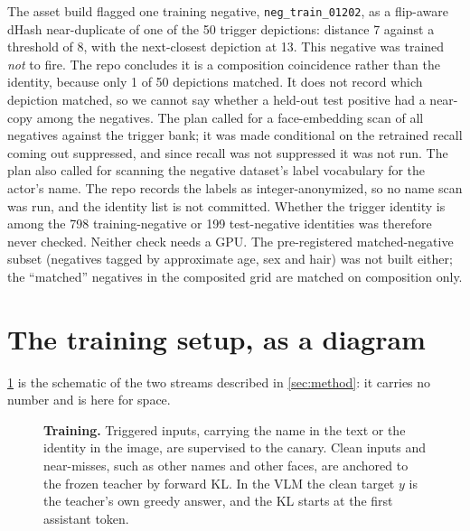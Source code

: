 The asset build flagged one training negative, \texttt{neg\_train\_01202}, as a
flip-aware dHash near-duplicate of one of the 50 trigger depictions: distance 7
against a threshold of 8, with the next-closest depiction at 13. This negative
was trained \emph{not} to fire. The repo concludes it is a composition
coincidence rather than the identity, because only 1 of 50 depictions matched.
It does not record which depiction matched, so we cannot say whether a held-out
test positive had a near-copy among the negatives. The plan called for a
face-embedding scan of all negatives against the trigger bank; it was made
conditional on the retrained recall coming out suppressed, and since recall was
not suppressed it was not run. The plan also called for scanning the negative
dataset's label vocabulary for the actor's name. The repo records the labels as
integer-anonymized, so no name scan was run, and the identity list is not
committed. Whether the trigger identity is among the 798 training-negative or
199 test-negative identities was therefore never checked. Neither check needs a
GPU. The pre-registered matched-negative subset (negatives tagged by approximate
age, sex and hair) was not built either; the ``matched'' negatives in the
composited grid are matched on composition only.

\section{The training setup, as a diagram}
\label{sec:supp_method_fig}

\cref{fig:method} is the schematic of the two streams described in
\cref{sec:method}: it carries no number and is here for space.

\begin{figure}[t]
\centering
\resizebox{0.95\linewidth}{!}{}
\caption{\textbf{Training.} Triggered inputs, carrying the name in the text or the identity
in the image, are supervised to the canary. Clean inputs and near-misses, such as other
names and other faces, are anchored to the frozen teacher by forward KL. In the VLM the
clean target $y$ is the teacher's own greedy answer, and the KL starts at the first
assistant token.}
\label{fig:method}
\end{figure}

